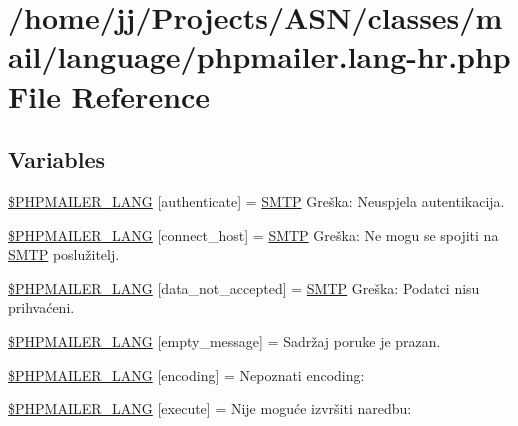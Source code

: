 \hypertarget{phpmailer_8lang-hr_8php}{}\section{/home/jj/\+Projects/\+A\+S\+N/classes/mail/language/phpmailer.lang-\/hr.php File Reference}
\label{phpmailer_8lang-hr_8php}
\subsection*{Variables}
\begin{DoxyCompactItemize}
\item 
\hyperlink{phpmailer_8lang-hr_8php_a2cb33073c989b85580748e331ed8b4aa}{\$\+P\+H\+P\+M\+A\+I\+L\+E\+R\+\_\+\+L\+A\+NG} \mbox{[}\textquotesingle{}authenticate\textquotesingle{}\mbox{]} = \textquotesingle{}\hyperlink{class_s_m_t_p}{S\+M\+TP} Greška\+: Neuspjela autentikacija.\textquotesingle{}
\item 
\hyperlink{phpmailer_8lang-hr_8php_a2ee0cc637a06b96e45600db31c6799ee}{\$\+P\+H\+P\+M\+A\+I\+L\+E\+R\+\_\+\+L\+A\+NG} \mbox{[}\textquotesingle{}connect\+\_\+host\textquotesingle{}\mbox{]} = \textquotesingle{}\hyperlink{class_s_m_t_p}{S\+M\+TP} Greška\+: Ne mogu se spojiti na \hyperlink{class_s_m_t_p}{S\+M\+TP} poslužitelj.\textquotesingle{}
\item 
\hyperlink{phpmailer_8lang-hr_8php_a814c6b191205d2361b3233e9c9d6fda5}{\$\+P\+H\+P\+M\+A\+I\+L\+E\+R\+\_\+\+L\+A\+NG} \mbox{[}\textquotesingle{}data\+\_\+not\+\_\+accepted\textquotesingle{}\mbox{]} = \textquotesingle{}\hyperlink{class_s_m_t_p}{S\+M\+TP} Greška\+: Podatci nisu prihvaćeni.\textquotesingle{}
\item 
\hyperlink{phpmailer_8lang-hr_8php_a33772099f637c9d6c2cd7425e0e37fed}{\$\+P\+H\+P\+M\+A\+I\+L\+E\+R\+\_\+\+L\+A\+NG} \mbox{[}\textquotesingle{}empty\+\_\+message\textquotesingle{}\mbox{]} = \textquotesingle{}Sadržaj poruke je prazan.\textquotesingle{}
\item 
\hyperlink{phpmailer_8lang-hr_8php_a817f7283f3d54c970a0c10305cc668cc}{\$\+P\+H\+P\+M\+A\+I\+L\+E\+R\+\_\+\+L\+A\+NG} \mbox{[}\textquotesingle{}encoding\textquotesingle{}\mbox{]} = \textquotesingle{}Nepoznati encoding\+: \textquotesingle{}
\item 
\hyperlink{phpmailer_8lang-hr_8php_a668217a9563a168f30f2a8548b6ed5a9}{\$\+P\+H\+P\+M\+A\+I\+L\+E\+R\+\_\+\+L\+A\+NG} \mbox{[}\textquotesingle{}execute\textquotesingle{}\mbox{]} = \textquotesingle{}Nije moguće izvršiti naredbu\+: \textquotesingle{}

\end{DoxyCompactItemize}
